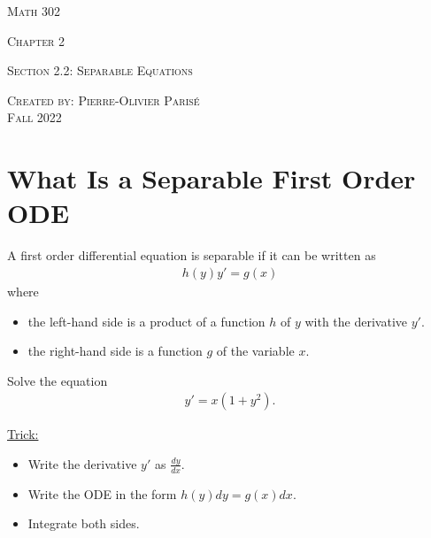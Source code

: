 \documentclass[12pt,a4paper]{article}
\newcounter{example}[section]
\begin{document}
\thispagestyle{empty}

\begin{center}
\vspace*{2.5cm}

{\Huge \textsc{Math 302}}

\vspace*{2cm}

{\LARGE \textsc{Chapter 2}} 

\vspace*{0.75cm}

\noindent\textsc{Section 2.2: Separable Equations}

\vspace*{0.75cm}

\tableofcontents

\vfill

\noindent \textsc{Created by: Pierre-Olivier Paris{\'e}} \\
\textsc{Fall 2022}
\end{center}

\newpage

\section{What Is a Separable First Order ODE}
A first order differential equation is separable if it can be written as
	\begin{align}
	h (y) y' = g(x) \label{Eq:SeparableCase}
	\end{align}
where
	\begin{itemize}
	\item the left-hand side is a product of a function $h$ of $y$ with the derivative $y'$.
	\item the right-hand side is a function $g$ of the variable $x$.
	\end{itemize}
	
\vspace*{16pt}
	
\begin{example}
Solve the equation
	\begin{align*}
	y' = x (1 + y^2 ) .
	\end{align*}
\end{example}

\vfill

\underline{Trick:} 
	\begin{itemize}
	\item Write the derivative $y'$ as $\frac{dy}{dx}$.
	\item Write the ODE in the form $h(y) dy = g(x) dx$.
	\item Integrate both sides.
	\end{itemize}
	
\end{document}
